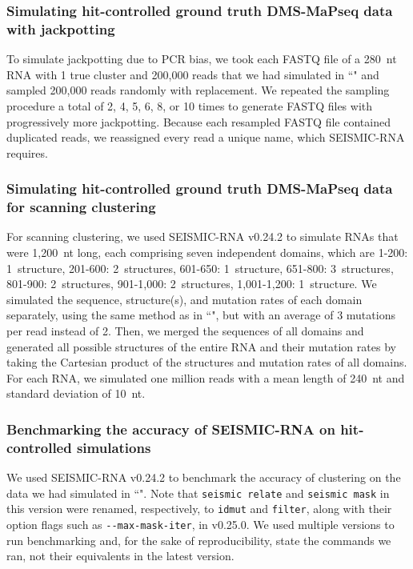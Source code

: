 \documentclass[unnumsec,webpdf,contemporary,large]{oup-authoring-template}%
\theoremstyle{thmstyleone}%
\theoremstyle{thmstyletwo}%
\theoremstyle{thmstylethree}%
\begin{document}
\subsubsection{Simulating hit-controlled ground truth DMS-MaPseq data with jackpotting}
\label{sim-jackpotting}

To simulate jackpotting due to PCR bias, we took each FASTQ file of a 280~nt RNA with 1 true cluster and 200,000 reads that we had simulated in ``" and sampled 200,000 reads randomly with replacement.
We repeated the sampling procedure a total of 2, 4, 5, 6, 8, or 10 times to generate FASTQ files with progressively more jackpotting.
Because each resampled FASTQ file contained duplicated reads, we reassigned every read a unique name, which SEISMIC-RNA requires.

\subsubsection{Simulating hit-controlled ground truth DMS-MaPseq data for scanning clustering}
\label{sim-clusterscan}

For scanning clustering, we used SEISMIC-RNA v0.24.2 to simulate RNAs that were 1,200~nt long, each comprising seven independent domains, which are 1-200: 1~structure, 201-600: 2~structures, 601-650: 1~structure, 651-800: 3~structures, 801-900: 2~structures, 901-1,000: 2~structures, 1,001-1,200: 1~structure.
We simulated the sequence, structure(s), and mutation rates of each domain separately, using the same method as in ``", but with an average of 3 mutations per read instead of 2.
Then, we merged the sequences of all domains and generated all possible structures of the entire RNA and their mutation rates by taking the Cartesian product of the structures and mutation rates of all domains.
For each RNA, we simulated one million reads with a mean length of 240~nt and standard deviation of 10~nt.

\subsubsection{Benchmarking the accuracy of SEISMIC-RNA on hit-controlled simulations}
\label{benchmark-accuracy-seismic-rna}

We used SEISMIC-RNA v0.24.2 to benchmark the accuracy of clustering on the data we had simulated in ``".
Note that \verb|seismic relate| and \verb|seismic mask| in this version were renamed, respectively, to \verb|idmut| and \verb|filter|, along with their option flags such as \verb|--max-mask-iter|, in v0.25.0.
We used multiple versions to run benchmarking and, for the sake of reproducibility, state the commands we ran, not their equivalents in the latest version.
\end{document}
